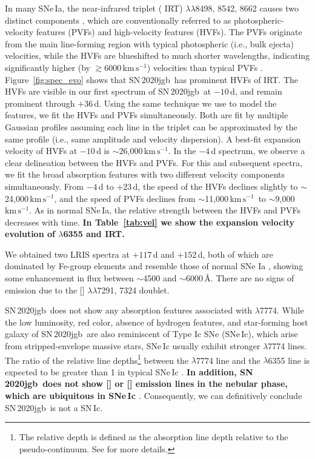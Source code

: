 \documentclass[twocolumn]{aastex631}
\newcommand{\sn}{SN\,2020jgb}
\newcommand{\kms}{$\mathrm{km}\,\mathrm{s}^{-1}$}
\newcommand{\revise}[1]{\textbf{#1}}
\begin{document}
In many SNe\,Ia, the  near-infrared triplet ( IRT) $\lambda\lambda$8498, 8542, 8662 causes two distinct components \citep{Mazzali_2005}, which are conventionally referred to as photospheric-velocity features (PVFs) and high-velocity features (HVFs). The PVFs originate from the main line-forming region with typical photospheric (i.e., bulk ejecta) velocities, while the HVFs are blueshifted to much shorter wavelengths, indicating significantly higher (by $\gtrsim$6000\,\kms) velocities than typical PVFs \citep{Silverman_HVF_2015}. Figure~\ref{fig:spec_evo} shows that \sn\ has prominent HVFs of  IRT. The HVFs are visible in our first spectrum of \sn\ at $-10$\,d, and remain prominent through $+36$\,d. Using the same technique we use to model the  features, we fit the HVFs and PVFs simultaneously. Both are fit by multiple Gaussian profiles assuming each line in the triplet can be approximated by the same profile (i.e., same amplitude and velocity dispersion). A best-fit expansion velocity of HVFs at $-10$\,d is $\sim$26,000\,\kms. In the $-4$\,d spectrum, we observe a clear delineation between the HVFs and PVFs. For this and subsequent spectra, we fit the broad absorption features with two different velocity components simultaneously. From $-4$\,d to $+23$\,d, the speed of the HVFs declines slightly to $\sim$24,000\,\kms, and the speed of PVFs declines from $\sim$11,000\,\kms\ to $\sim$9,000\,\kms. As in normal SNe\,Ia, the relative strength between the HVFs and PVFs decreases with time. \revise{In Table~\ref{tab:vel} we show the expansion velocity evolution of \ion{Si}{2} $\lambda$6355 and \ion{Ca}{2} IRT.}



We obtained two LRIS spectra at $+117$\,d and $+152$\,d, both of which are dominated by Fe-group elements and resemble those of normal SNe Ia \citep[e.g., SN\,2011fe;][]{Mazzali_2015}, showing some enhancement in flux between $\sim$4500 and $\sim$6000\,\AA. There are no signs of emission due to the [] $\lambda\lambda$7291, 7324 doublet.

\sn\ does not show any absorption features associated with  $\lambda$7774. While the low luminosity, red color, absence of hydrogen features, and star-forming host galaxy of \sn\ are also reminiscent of Type Ic SNe (SNe\,Ic), which arise from stripped-envelope massive stars, SNe\,Ic usually exhibit stronger  $\lambda$7774 lines. The ratio of the relative line depths\footnote{The relative depth is defined as the absorption line depth relative to the pseudo-continuum. See \citet{Sun_2017} for more details.} between the  $\lambda$7774 line and the  $\lambda$6355 line is expected to be greater than 1 in typical SNe\,Ic \citep{Sun_2017, Gal-Yam_2017}. \revise{In addition, \sn\ does not show [] or [\ion{Ca}{2}] emission lines in the nebular phase, which are ubiquitous in SNe\,Ic \citep{Jerkstrand_2017}}. Consequently, we can definitively conclude \sn\ is not a SN\,Ic.
\end{document}
